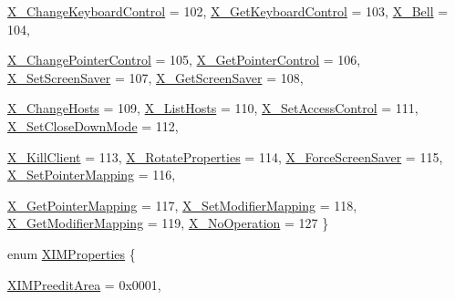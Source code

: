 \begin{DoxyCompactItemize}
\hyperlink{namespace_tao_1_1_platform_1_1_x11_a2cfd0ff14439adb84809be96fb4c7d4b}{X\_\-ChangeKeyboardControl} =  102, 
\hyperlink{namespace_tao_1_1_platform_1_1_x11_a2cfd0ff14439adb84809be96fb4c7d4b}{X\_\-GetKeyboardControl} =  103, 
\hyperlink{namespace_tao_1_1_platform_1_1_x11_a2cfd0ff14439adb84809be96fb4c7d4b}{X\_\-Bell} =  104, 
\par
\hyperlink{namespace_tao_1_1_platform_1_1_x11_a2cfd0ff14439adb84809be96fb4c7d4b}{X\_\-ChangePointerControl} =  105, 
\hyperlink{namespace_tao_1_1_platform_1_1_x11_a2cfd0ff14439adb84809be96fb4c7d4b}{X\_\-GetPointerControl} =  106, 
\hyperlink{namespace_tao_1_1_platform_1_1_x11_a2cfd0ff14439adb84809be96fb4c7d4b}{X\_\-SetScreenSaver} =  107, 
\hyperlink{namespace_tao_1_1_platform_1_1_x11_a2cfd0ff14439adb84809be96fb4c7d4b}{X\_\-GetScreenSaver} =  108, 
\par
\hyperlink{namespace_tao_1_1_platform_1_1_x11_a2cfd0ff14439adb84809be96fb4c7d4b}{X\_\-ChangeHosts} =  109, 
\hyperlink{namespace_tao_1_1_platform_1_1_x11_a2cfd0ff14439adb84809be96fb4c7d4b}{X\_\-ListHosts} =  110, 
\hyperlink{namespace_tao_1_1_platform_1_1_x11_a2cfd0ff14439adb84809be96fb4c7d4b}{X\_\-SetAccessControl} =  111, 
\hyperlink{namespace_tao_1_1_platform_1_1_x11_a2cfd0ff14439adb84809be96fb4c7d4b}{X\_\-SetCloseDownMode} =  112, 
\par
\hyperlink{namespace_tao_1_1_platform_1_1_x11_a2cfd0ff14439adb84809be96fb4c7d4b}{X\_\-KillClient} =  113, 
\hyperlink{namespace_tao_1_1_platform_1_1_x11_a2cfd0ff14439adb84809be96fb4c7d4b}{X\_\-RotateProperties} =  114, 
\hyperlink{namespace_tao_1_1_platform_1_1_x11_a2cfd0ff14439adb84809be96fb4c7d4b}{X\_\-ForceScreenSaver} =  115, 
\hyperlink{namespace_tao_1_1_platform_1_1_x11_a2cfd0ff14439adb84809be96fb4c7d4b}{X\_\-SetPointerMapping} =  116, 
\par
\hyperlink{namespace_tao_1_1_platform_1_1_x11_a2cfd0ff14439adb84809be96fb4c7d4b}{X\_\-GetPointerMapping} =  117, 
\hyperlink{namespace_tao_1_1_platform_1_1_x11_a2cfd0ff14439adb84809be96fb4c7d4b}{X\_\-SetModifierMapping} =  118, 
\hyperlink{namespace_tao_1_1_platform_1_1_x11_a2cfd0ff14439adb84809be96fb4c7d4b}{X\_\-GetModifierMapping} =  119, 
\hyperlink{namespace_tao_1_1_platform_1_1_x11_a2cfd0ff14439adb84809be96fb4c7d4b}{X\_\-NoOperation} =  127
 \}
\item 
enum \hyperlink{namespace_tao_1_1_platform_1_1_x11_a90968e47c9d770cef201f56c70f857f8}{XIMProperties} \{ \par
\hyperlink{namespace_tao_1_1_platform_1_1_x11_a90968e47c9d770cef201f56c70f857f8}{XIMPreeditArea} =  0x0001, 

\end{DoxyCompactItemize}
